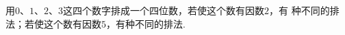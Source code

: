用$0$、$1$、$2$、$3$这四个数字排成一个四位数，若使这个数有因数$2$，有 \key{\hspace{4em}}种不同的排法；若使这个数有因数$5$，有\key{\hspace{4em}}种不同的排法.\\